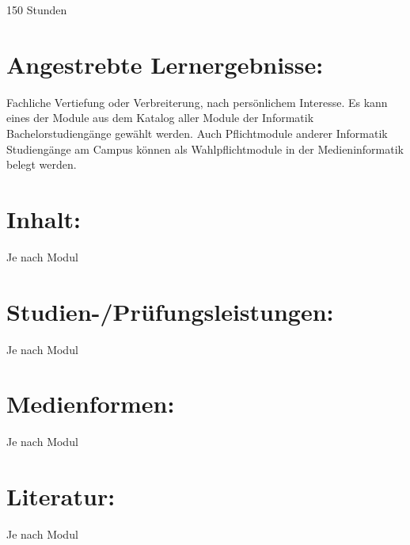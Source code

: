 150 Stunden

\section*{Angestrebte
Lernergebnisse:}\label{angestrebte-lernergebnisse-28}

Fachliche Vertiefung oder Verbreiterung, nach persönlichem Interesse. Es
kann eines der Module aus dem Katalog aller Module der Informatik
Bachelorstudiengänge gewählt werden. Auch Pflichtmodule anderer
Informatik Studiengänge am Campus können als Wahlpflichtmodule in der
Medieninformatik belegt werden.

\section*{Inhalt:}\label{inhalt-28}

Je nach Modul

\section*{Studien-/Prüfungsleistungen:}\label{studien-pruxfcfungsleistungen-26}

Je nach Modul

\section*{Medienformen:}\label{medienformen-19}

Je nach Modul

\section*{Literatur:}\label{literatur-24}

Je nach Modul
